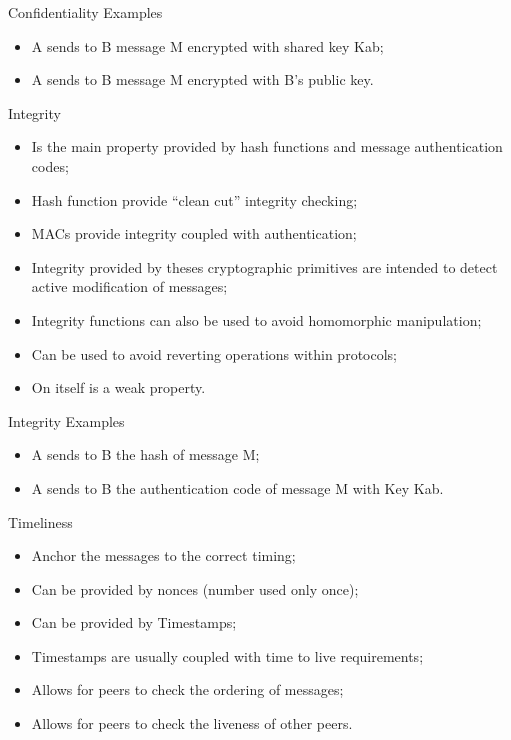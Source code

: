\documentclass[12pt,table,xcolor={dvipsnames}]{beamer}
\begin{document}
\begin{frame}{Confidentiality Examples}
\begin{itemize}
\item A sends to B message M encrypted with shared key Kab;\pause
\item A sends to B message M encrypted with B's public key.
\end{itemize}
\end{frame}

\begin{frame}{Integrity}
\begin{itemize}
\item Is the main property provided by hash functions and message authentication codes;\pause
\item Hash function provide ``clean cut'' integrity checking;\pause
\item MACs provide integrity coupled with authentication;\pause
\item Integrity provided by theses cryptographic primitives are intended to detect active modification of messages;\pause
\item Integrity functions can also be used to avoid homomorphic manipulation;\pause
\item Can be used to avoid reverting operations within protocols;\pause
\item On itself is a weak property.
\end{itemize}
\end{frame}

\begin{frame}{Integrity Examples}
\begin{itemize}
\item A sends to B the hash of message M;\pause
\item A sends to B the authentication code of message M with Key Kab.
\end{itemize}
\end{frame}

\begin{frame}{Timeliness}
\begin{itemize}
\item Anchor the messages to the correct timing;\pause
\item Can be provided by nonces (number used only once);\pause
\item Can be provided by Timestamps;\pause
\item Timestamps are usually coupled with time to live requirements;\pause
\item Allows for peers to check the ordering of messages;\pause
\item Allows for peers to check the liveness of other peers.
\end{itemize}
\end{frame}
\end{document}
